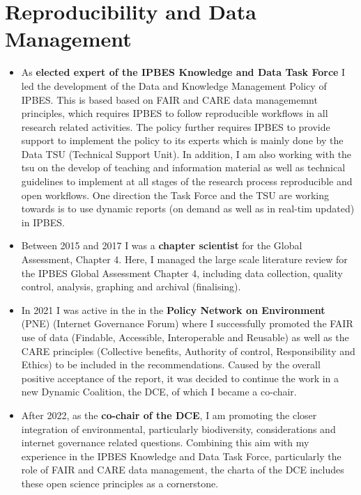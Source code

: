 \documentclass[a4paper]{article}
\begin{document}
\section{Reproducibility and Data Management}
\begin{itemize}[leftmargin=1.1in]

\item As \textbf{elected expert of the IPBES Knowledge and Data Task
	Force} I led the development of the Data and Knowledge Management
	Policy of IPBES. This is based based on FAIR and CARE data
	managememnt principles, which requires IPBES to follow reproducible
	workflows in all research related activities. The policy further
	requires IPBES to provide support to implement the policy to its
	experts which is mainly done by the Data TSU (Technical Support
	Unit). In addition, I am also working with the tsu on the develop of
	teaching and information material as well as technical guidelines to
	implement at all stages of the research process reproducible and open
	workflows. One direction the Task Force and the TSU are working
	towards is to use dynamic reports (on demand as well as in real-tim
	updated) in IPBES.

\item Between 2015 and 2017 I was a \textbf{chapter scientist} for the
	Global Assessment, Chapter 4. Here, I managed the large scale
	literature review for the IPBES Global Assessment Chapter 4,
	including data collection, quality control, analysis, graphing and
	archival (finalising).

\item In 2021 I was active in the  in the \textbf{Policy Network on
	Environment} (PNE) (Internet Governance Forum) where I successfully
	promoted the FAIR use of data (Findable, Accessible, Interoperable
	and Reusable) as well as the CARE principles (Collective benefits,
	Authority of control, Responsibility and Ethics) to be included in
	the recommendations. Caused by the overall positive acceptance of the
	report, it was decided to continue the work in a new Dynamic
	Coalition, the DCE, of which I became a co-chair.

\item After 2022, as the \textbf{co-chair of the DCE}, I am
	promoting the closer integration of environmental, particularly
	biodiversity, considerations and internet governance related
	questions. Combining this aim with my experience in the IPBES
	Knowledge and Data Task Force, particularly the role of FAIR and CARE
	data management, the charta of the DCE includes these open science
	principles as a cornerstone.

\end{itemize}
\end{document}
